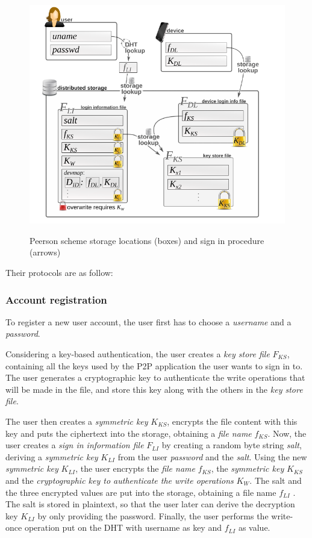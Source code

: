 \begin{figure}
\center
\includegraphics[width=12cm]{../img/password_peerson}\\
\caption{Peerson scheme storage locations (boxes) and sign in procedure (arrows) }
\label{fig:p2p_peerson}
\end{figure}

Their protocols are as follow:
%
\subsubsection{Account registration}
To register a new user account, the user first
has to choose a \textit{username} and a \textit{password}.

Considering a key-based authentication, the user creates a \textit{key store
file} $F_{KS}$, containing all the
keys used by the P2P application the user wants to sign in to.
The user generates a cryptographic key to authenticate the write operations
that will be made in the file, and store this key along with the others in the
\textit{key store file}.

The user then creates a \textit{symmetric key} $K_{KS}$,
encrypts the file content with this key and puts the ciphertext
into the storage, obtaining a \textit{file name} $f_{KS}$. Now, the user
creates a \textit{sign in information file} $F_{LI}$ by creating a random
byte string \textit{salt}, deriving a \textit{symmetric key} $K_{LI}$ from the user
\textit{password} and the \textit{salt}.
Using the new \textit{ symmetric key} $K_{LI}$, the user encrypts the
\textit{file name} $f_{KS}$,
the \textit{symmetric key} $K_{KS}$ and the \textit{cryptographic key to
authenticate the write operations} $K_W$.
 The salt and the three encrypted values are put
into the storage, obtaining a file name $f_{LI}$ . The salt is stored
in plaintext, so that the user later can derive the decryption
key $K_{LI}$ by only providing the password. Finally, the user
performs the write-once operation put on the DHT with
username as key and $f_{LI}$ as value.


